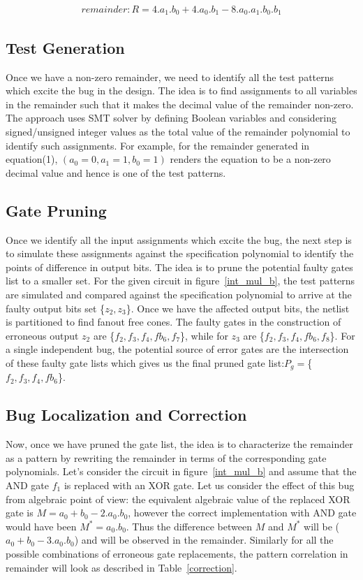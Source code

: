 \documentclass{article}
\begin{document}
\begin{align}
remainder: R = 4.a_1.b_0 + 4.a_0.b_1 - 8.a_0.a_1.b_0.b_1
\end{align}


\subsection{Test Generation}
Once we have a non-zero remainder, we need to identify all the test patterns which excite the bug in the design. The idea is to find assignments to all variables in the remainder such that it makes the decimal value of the remainder non-zero. The approach uses SMT solver by defining Boolean variables and considering signed/unsigned integer values as the total value of the remainder polynomial to identify such assignments.
For example, for the remainder generated in equation(1), $(a_0=0,a_1=1,b_0=1)$ renders the equation to be a non-zero decimal value and hence is one of the test patterns.

\subsection{Gate Pruning}
Once we identify all the input assignments which excite the bug, the next step is to simulate these assignments against the specification polynomial to identify the points of difference in output bits. The idea is to prune the potential faulty gates list to a smaller set. For the given circuit in figure~\ref{int_mul_b}, the test patterns are simulated and compared against the specification polynomial to arrive at the faulty output bits set \{$z_2,z_3$\}. Once we have the affected output bits, the netlist is partitioned to find fanout free cones. The faulty gates in the construction of erroneous output $z_2$ are \{$f_2,f_3,f_4,fb_6,f_7$\}, while for $z_3$ are \{$f_2,f_3,f_4,fb_6,f_8$\}. For a single independent bug, the potential source of error gates are the intersection of these faulty gate lists which gives us the final pruned gate list:$P_g=$\{$f_2,f_3,f_4,fb_6$\}.

\subsection{Bug Localization and Correction}
Now, once we have pruned the gate list, the idea is to characterize the remainder as a pattern by rewriting the remainder in terms of the corresponding gate polynomials. Let's consider the circuit in figure~\ref{int_mul_b} and assume that the AND gate $f_1$ is replaced with an XOR gate. Let us consider the effect of this bug from algebraic point of view: the equivalent algebraic value of the replaced XOR gate is $M=a_0+b_0-2.a_0.b_0$, however the correct implementation with AND gate would have been $M^*=a_0.b_0$. Thus the difference between $M$ and $M^*$ will be ($a_0+b_0-3.a_0.b_0$) and will be observed in the remainder. Similarly for all the possible combinations of erroneous gate replacements, the pattern correlation in remainder will look as described in Table~\ref{correction}.
\end{document}
